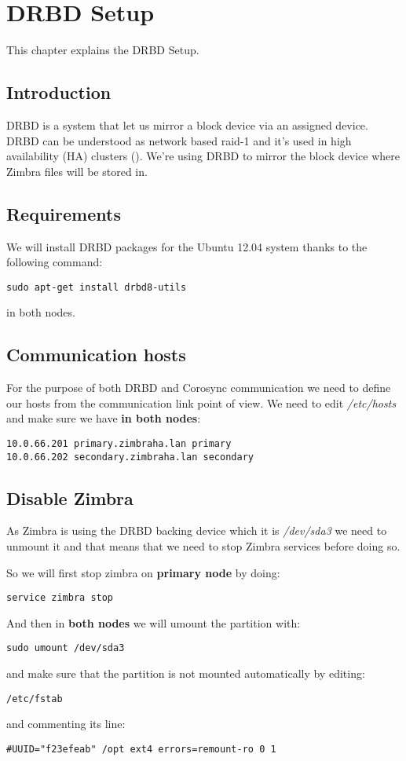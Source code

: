 

\chapter{DRBD Setup}
\label{chap:drbd-setup}
This chapter explains the DRBD Setup.

\section {Introduction}
DRBD is a system that let us mirror a block device via an assigned device. DRBD can be understood as network based raid-1 and it's used in high availability (HA) clusters (\cite{LinbitDRBDWhatIs}).
We're using DRBD to mirror the block device where Zimbra files will be stored in.

\section {Requirements}
We will install DRBD packages for the Ubuntu 12.04 system thanks to the following command:
\begin{verbatim}
sudo apt-get install drbd8-utils
\end{verbatim}
in both nodes.
\section {Communication hosts}
For the purpose of both DRBD and Corosync communication we need to define our hosts from the communication link point of view. We need to edit \textit{/etc/hosts} and make sure we have \textbf{in both nodes}:

\begin{verbatim}
10.0.66.201 primary.zimbraha.lan primary
10.0.66.202 secondary.zimbraha.lan secondary
\end{verbatim}

\section {Disable Zimbra}
As Zimbra is using the DRBD backing device which it is \textit{/dev/sda3} we need to unmount it and that means that we need to stop Zimbra services before doing so.

So we will first stop zimbra on \textbf{primary node} by doing:
\begin{verbatim}
service zimbra stop
\end{verbatim}

And then in \textbf{both nodes} we will umount the partition with:
\begin{verbatim}
sudo umount /dev/sda3
\end{verbatim}
and make sure that the partition is not mounted automatically by editing:
\begin{verbatim}
/etc/fstab
\end{verbatim}
and commenting its line:
\begin{verbatim}
#UUID="f23efeab" /opt ext4 errors=remount-ro 0 1
\end{verbatim}

